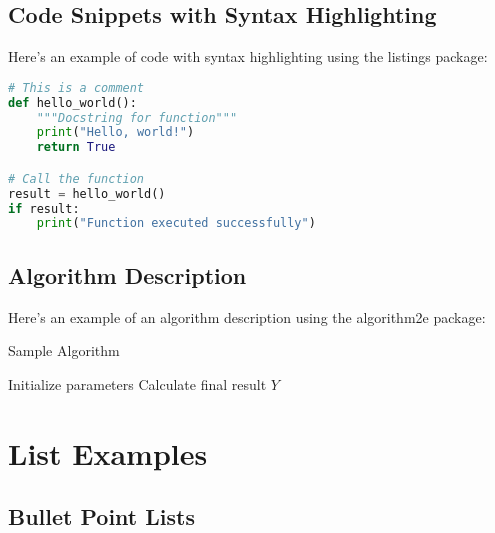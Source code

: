 \documentclass[a4paper,11pt]{article}
\begin{document}
\subsection{Code Snippets with Syntax Highlighting}

Here's an example of code with syntax highlighting using the listings package:

\begin{lstlisting}[language=Python, caption=Sample Python Code]
# This is a comment
def hello_world():
    """Docstring for function"""
    print("Hello, world!")
    return True

# Call the function
result = hello_world()
if result:
    print("Function executed successfully")
\end{lstlisting}

% 

\subsection{Algorithm Description}

Here's an example of an algorithm description using the algorithm2e package:

\begin{algorithm}[H]
\caption{Sample Algorithm}
\SetAlgoLined
{}
Initialize parameters\;
Calculate final result $Y$\;
\;
\end{algorithm}

\section{List Examples}

\subsection{Bullet Point Lists}
\end{document}
